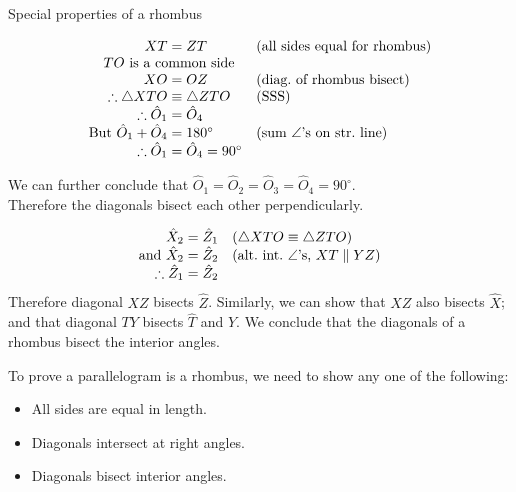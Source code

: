 \begin{wex}{Special properties of a rhombus}
{\begin{minipage}{\textwidth}
\end{minipage}
}
{
\begin{equation*}
  \begin{array}{r@{\;}l@{\quad}l}
    XT &= ZT & \mbox{(all sides equal for rhombus)} \\
    \multicolumn{2}{c}{TO \mbox{ is a common side}} & \\
    XO &= OZ & \mbox{(diag.\ of rhombus bisect)} \\ 
    \therefore \triangle XTO &\equiv \triangle ZTO & \mbox{(SSS)} \\
    \therefore \hat{O}_1 &= \hat{O}_4 & \\
    \mbox{But } \hat{O}_1 + \hat{O}_4 &= 180^\circ & \mbox{(sum $\angle$'s on str.\ line)} \\
    \therefore \hat{O}_1 &= \hat{O}_4 = 90^\circ & 
  \end{array}
\end{equation*}

We can further conclude that $\hat{O}_1 = \hat{O}_2 = \hat{O}_3 = \hat{O}_4 = 90^\circ$.\\
Therefore the diagonals bisect each other perpendicularly.

\begin{equation*}
  \begin{array}{r@{\;}l@{\quad}l}
    \hat{X}_2 &= \hat{Z}_1 & \mbox{($\triangle XTO \equiv \triangle ZTO$)} \\
    \mbox{and } \hat{X}_2 &= \hat{Z}_2 & \mbox{(alt.\ int.\ $\angle$'s, $XT \parallel YZ$)} \\
    \therefore \hat{Z}_1 &= \hat{Z}_2 & \\
  \end{array}
\end{equation*}
Therefore diagonal $XZ$ bisects $\hat{Z}$. Similarly, we can show that
$XZ$ also bisects $\hat{X}$; and that diagonal $TY$ bisects $\hat{T}$
and $\hat{Y}$.\newline
We conclude that the diagonals of a rhombus bisect the interior
angles.}
\end{wex}

\par
To prove a parallelogram is a rhombus, we need to show any one of the following:
\begin{itemize}
 \item All sides are equal in length.
 \item Diagonals intersect at right angles.
 \item Diagonals bisect interior angles.
\end{itemize}

